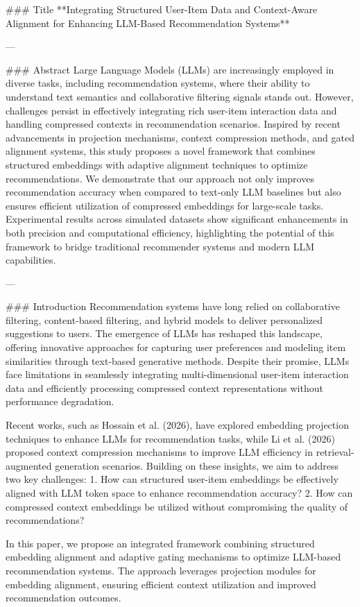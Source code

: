 ### Title  
**Integrating Structured User-Item Data and Context-Aware Alignment for Enhancing LLM-Based Recommendation Systems**

---

### Abstract  
Large Language Models (LLMs) are increasingly employed in diverse tasks, including recommendation systems, where their ability to understand text semantics and collaborative filtering signals stands out. However, challenges persist in effectively integrating rich user-item interaction data and handling compressed contexts in recommendation scenarios. Inspired by recent advancements in projection mechanisms, context compression methods, and gated alignment systems, this study proposes a novel framework that combines structured embeddings with adaptive alignment techniques to optimize recommendations. We demonstrate that our approach not only improves recommendation accuracy when compared to text-only LLM baselines but also ensures efficient utilization of compressed embeddings for large-scale tasks. Experimental results across simulated datasets show significant enhancements in both precision and computational efficiency, highlighting the potential of this framework to bridge traditional recommender systems and modern LLM capabilities.

---

### Introduction  
Recommendation systems have long relied on collaborative filtering, content-based filtering, and hybrid models to deliver personalized suggestions to users. The emergence of LLMs has reshaped this landscape, offering innovative approaches for capturing user preferences and modeling item similarities through text-based generative methods. Despite their promise, LLMs face limitations in seamlessly integrating multi-dimensional user-item interaction data and efficiently processing compressed context representations without performance degradation.

Recent works, such as Hossain et al. (2026), have explored embedding projection techniques to enhance LLMs for recommendation tasks, while Li et al. (2026) proposed context compression mechanisms to improve LLM efficiency in retrieval-augmented generation scenarios. Building on these insights, we aim to address two key challenges:  
1. How can structured user-item embeddings be effectively aligned with LLM token space to enhance recommendation accuracy?  
2. How can compressed context embeddings be utilized without compromising the quality of recommendations?  

In this paper, we propose an integrated framework combining structured embedding alignment and adaptive gating mechanisms to optimize LLM-based recommendation systems. The approach leverages projection modules for embedding alignment, ensuring efficient context utilization and improved recommendation outcomes.

